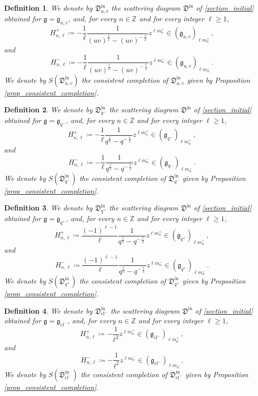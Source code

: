 \documentclass[12pt, a4paper]{amsart}
\newtheorem{defn}{Definition}[section]
\newcommand\Z{\mathbb Z}
\newcommand\fD{\mathfrak D}
\newcommand\fg{\mathfrak g}
\newcommand\cl{\operatorname{cl}}
\newcommand\iin{\mathrm{in}}
\begin{document}
\begin{defn} \label{def_scattering_D_in_u_v}
We denote by $\fD^\iin_{u,v}$ the scattering diagram $\fD^\iin$ of \cref{section_initial}
obtained for $\fg=\fg_{u,v}$, and, for every $n \in \Z$ and for every integer $\ell \geqslant 1$,
\[H_{n,\ell}^+ \coloneq - \frac{1}{\ell} \frac{1}{(uv)^{\frac{\ell}{2}}
-(uv)^{-\frac{\ell}{2}}} z^{\ell m_n^+} \in (\fg_{u,v})_{\ell m_n^+}\,,\]
and 
\[H_{n,\ell}^- \coloneq - \frac{1}{\ell} \frac{1}{(uv)^{\frac{\ell}{2}}
-(uv)^{-\frac{\ell}{2}}} z^{\ell m_n^-}\in (\fg_{u,v})_{\ell m_n^-}\,.\]
We denote by $S(\fD^\iin_{u,v})$ the consistent completion of $\fD^\iin_{u,v}$ given by 
Proposition \ref{prop_consistent_completion}.
\end{defn}

\begin{defn}\label{def_scattering_q_-}
We denote by $\fD^\iin_{q^-}$ the scattering diagram $\fD^\iin$ of  \cref{section_initial}
obtained for $\fg=\fg_{q^-}$, and, for every $n \in \Z$ and for every integer $\ell \geqslant 1$,
\[H_{n,\ell}^+ \coloneq - \frac{1}{\ell} \frac{1}{q^{\frac{\ell}{2}}
-q^{-\frac{\ell}{2}}} z^{\ell m_n^+} \in (\fg_{q^-})_{\ell m_n^+}\,,\]
and 
\[H_{n,\ell}^- \coloneq - \frac{1}{\ell} \frac{1}{q^{\frac{\ell}{2}}
-q^{-\frac{\ell}{2}}} z^{\ell m_n^-}\in (\fg_{q^-})_{\ell m_n^-}\,.\]
We denote by $S(\fD^\iin_{q^-})$ the consistent completion of $\fD^\iin_{q^-}$ given by 
Proposition \ref{prop_consistent_completion}.
\end{defn}


\begin{defn}\label{def_scattering_q_+}
We denote by $\fD^\iin_{q^+}$ the scattering diagram $\fD^\iin$ of \cref{section_initial}
obtained for $\fg=\fg_{q^+}$, and, for every $n \in \Z$ and for every integer $\ell \geqslant 1$,
\[H_{n,\ell}^+ \coloneq \frac{(-1)^{\ell-1}}{\ell} \frac{1}{q^{\frac{\ell}{2}}
-q^{-\frac{\ell}{2}}} z^{\ell m_n^+} \in (\fg_{q^+})_{\ell m_n^+}\,,\]
and 
\[H_{n,\ell}^- \coloneq \frac{(-1)^{\ell-1}}{\ell} \frac{1}{q^{\frac{\ell}{2}}
-q^{-\frac{\ell}{2}}} z^{\ell m_n^-}\in (\fg_{q^+})_{\ell m_n^-}\,.\]
We denote by $S(\fD^\iin_{q^+})$ the consistent completion of $\fD^\iin_{q^+}$ given by 
Proposition \ref{prop_consistent_completion}.
\end{defn}



\begin{defn} 
We denote by $\fD^\iin_{\cl^-}$ the scattering diagram $\fD^\iin$ of \cref{section_initial}
obtained for $\fg=\fg_{\cl^-}$, and, for every $n \in \Z$ and for every integer $\ell \geqslant 1$,
\[H_{n,\ell}^+ \coloneq - \frac{1}{\ell^2} z^{\ell m_n^+} \in (\fg_{\cl^-})_{\ell m_n^+}\,,\]
and 
\[H_{n,\ell}^- \coloneq - \frac{1}{\ell^2} z^{\ell m_n^-}\in (\fg_{\cl^-})_{\ell m_n^-}\,.\]
We denote by $S(\fD^\iin_{\cl^-})$ the consistent completion of $\fD^\iin_{\cl^-}$ given by 
Proposition \ref{prop_consistent_completion}.
\end{defn}
\end{document}
